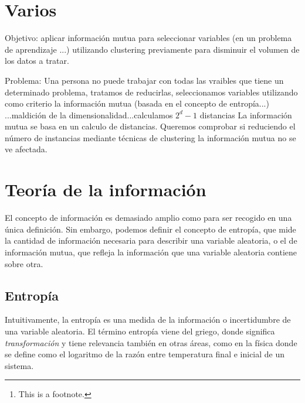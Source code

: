 \documentclass[10pt,a4paper]{article} %
\theoremstyle{definition}
\begin{document}
    \pagestyle{plain}
    \title{\rmfamily\normalfont{}}
    \author{}
    \date{} %

    \maketitle

    \begin{abstract}
        \noindent\lipsum[1] Just a test.\footnote{This is a footnote.}
    \end{abstract}

    \tableofcontents

    \section{Varios}
    Objetivo: aplicar información mutua para seleccionar variables (en un problema de aprendizaje ...) utilizando clustering previamente para disminuir el volumen de los datos a tratar.

    Problema: Una persona no puede trabajar con todas las vraibles que tiene un determinado problema, tratamos de reducirlas, seleccionamos variables utilizando como criterio la información mutua (basada en el concepto de entropía...)
    ...maldición de la dimensionalidad...calculamos $2^d-1$ distancias
    La información mutua se basa en un calculo de distancias. Queremos comprobar si reduciendo el número de instancias mediante técnicas de clustering la información mutua no se ve afectada.
     
    \section{Teoría de la información}

    El concepto de información es demasiado amplio como para ser recogido en una única definición. Sin embargo, podemos definir el concepto de entropía, que mide la cantidad de información necesaria para describir una variable aleatoria, o el de información mutua, que refleja la información que una variable aleatoria contiene sobre otra.

    \subsection{Entropía}

    Intuitivamente, la entropía es una medida de la información o incertidumbre de una variable aleatoria. El término entropía viene del griego, donde significa \textit{transformación} y tiene relevancia también en otras áreas, como en la física donde se define como el logaritmo de la razón entre temperatura final e inicial de un sistema.
\end{document}
